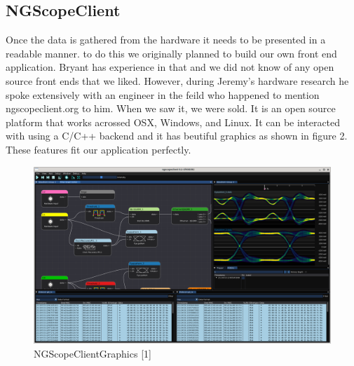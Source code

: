 \subsection{NGScopeClient}
	Once the data is gathered from the hardware it needs to be presented in a readable manner. to do this we originally planned to build our own front end application. Bryant has experience in that and we did not know of any open source front ends that we liked. However, during Jeremy's hardware research he spoke extensively with an engineer in the feild who happened to mention ngscopeclient.org to him. When we saw it, we were sold. It is an open source platform that works acrossed OSX, Windows, and Linux. It can be interacted with using a C/C++ backend and it has beutiful graphics as shown in figure 2. These features fit our application perfectly.
	
		\begin{figure}[H]
		\centering
		\includegraphics[width=0.8\linewidth]{images/ngscopeclient-intro.png}
		\caption{NGScopeClientGraphics [1]}
		\label{fig:ngscope-client}
		\vspace{15px}
	\end{figure}
	

	‌